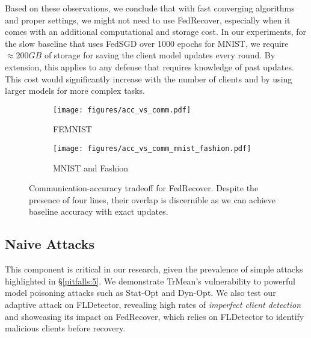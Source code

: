 Based on these observations, we conclude that with fast converging algorithms and proper settings, we might not need to use FedRecover, especially when it comes with an additional computational and storage cost. In our experiments, for the slow baseline that uses FedSGD over 1000 epochs for MNIST, we require \textbf{\emph{$\approx200GB$}} of storage for saving the client model updates every round. By extension, this applies to any defense that requires knowledge of past updates. This cost would significantly increase with the number of clients and by using larger models for more complex tasks.
\begin{figure}[t]
    \centering
    \begin{subfigure}[b]{0.48\columnwidth}
        \texttt{[image: figures/acc\_vs\_comm.pdf]}
        \caption{FEMNIST}
        \label{fig:acc_vs_comm_femnist}
    \end{subfigure}
    \begin{subfigure}[b]{0.48\columnwidth}
        \texttt{[image: figures/acc\_vs\_comm\_mnist\_fashion.pdf]}
        \caption{MNIST and Fashion}
        \label{fig:acc_vs_comm_mnist_fashion}
    \end{subfigure}
    \caption{Communication-accuracy tradeoff for FedRecover. Despite the presence of four lines, their overlap is discernible as we can achieve baseline accuracy with exact updates.}
    \label{fig:acc_vs_comm}
\end{figure}
\subsection{Naive Attacks}\label{impact:attacks}
This component is critical in our research, given the prevalence of simple attacks highlighted in \S\ref{pitfalls:5}. We demonstrate TrMean's vulnerability to powerful model poisoning attacks such as Stat-Opt and Dyn-Opt. We also test our adaptive attack on FLDetector, revealing high rates of \emph{imperfect client detection} and showcasing its impact on FedRecover, which relies on FLDetector to identify malicious clients before recovery.
